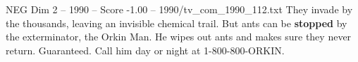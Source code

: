\begin{textsample}{NEG Dim 2 – 1990 – Score -1.00 – 1990/tv\_com\_1990\_112.txt}  \label{ex:f2_neg_063}
They invade by the thousands, leaving an invisible chemical trail.
But ants can be \textbf{stopped} by the exterminator, the Orkin Man.
He wipes out ants and makes sure they never return.
Guaranteed.
Call him day or night at 1-800-800-ORKIN.

\end{textsample}
